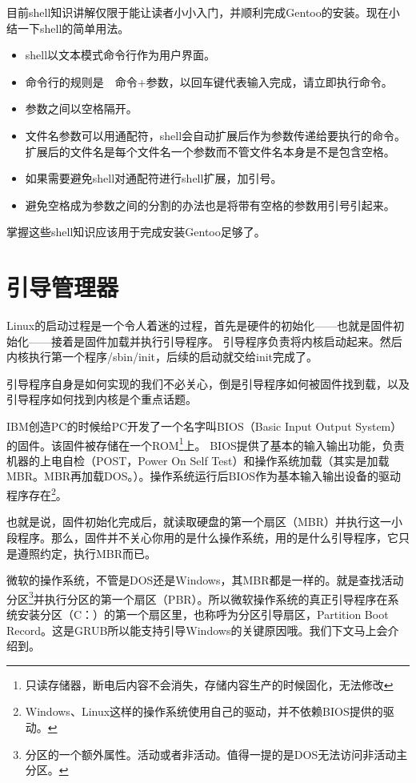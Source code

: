 \documentclass[amstex,twoside]{ctexbook}
\begin{document}
目前shell知识讲解仅限于能让读者小小入门，并顺利完成Gentoo的安装。现在小结一下shell的简单用法。

\begin{itemize}
\item shell以文本模式命令行作为用户界面。
\item 命令行的规则是　命令+参数，以回车键代表输入完成，请立即执行命令。
\item 参数之间以空格隔开。
\item 文件名参数可以用通配符，shell会自动扩展后作为参数传递给要执行的命令。扩展后的文件名是每个文件名一个参数而不管文件名本身是不是包含空格。
\item 如果需要避免shell对通配符进行shell扩展，加引号。
\item 避免空格成为参数之间的分割的办法也是将带有空格的参数用引号引起来。
\end{itemize}

掌握这些shell知识应该用于完成安装Gentoo足够了。


\section{引导管理器}\label{sec:grub}
Linux的启动过程是一个令人着迷的过程，首先是硬件的初始化——也就是固件初始化——接着是固件加载并执行引导程序。
引导程序负责将内核启动起来。然后内核执行第一个程序/sbin/init，后续的启动就交给init完成了。

引导程序自身是如何实现的我们不必关心，倒是引导程序如何被固件找到载，以及引导程序如何找到内核是个重点话题。

IBM创造PC的时候给PC开发了一个名字叫BIOS（Basic Input Output System）的固件。该固件被存储在一个ROM\footnote{只读存储器，断电后内容不会消失，存储内容生产的时候固化，无法修改}上。 BIOS提供了基本的输入输出功能，负责机器的上电自检（POST，Power On Self Test）和操作系统加载（其实是加载MBR。MBR再加载DOS。）。操作系统运行后BIOS作为基本输入输出设备的驱动程序存在\footnote{Windows、Linux这样的操作系统使用自己的驱动，并不依赖BIOS提供的驱动。}。

也就是说，固件初始化完成后，就读取硬盘的第一个扇区（MBR）并执行这一小段程序。那么，固件并不关心你用的是什么操作系统，用的是什么引导程序，它只是遵照约定，执行MBR而已。

微软的操作系统，不管是DOS还是Windows，其MBR都是一样的。就是查找活动分区\footnote{分区的一个额外属性。活动或者非活动。值得一提的是DOS无法访问非活动主分区。}并执行分区的第一个扇区（PBR）。所以微软操作系统的真正引导程序在系统安装分区（C：）的第一个扇区里，也称呼为分区引导扇区，Partition Boot Record。这是GRUB所以能支持引导Windows的关键原因哦。我们下文马上会介绍到。
\end{document}

